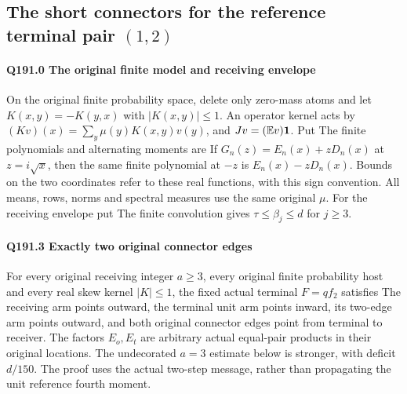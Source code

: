 \subsection{The short connectors for the reference terminal pair $(1,\allowbreak 2)$}\label{proof:Q5-C191}
\paragraph{Q191.0 The original finite model and receiving envelope}\label{part:Q191.0}
On the original finite probability space, delete only zero-mass atoms and let
$K(x,\allowbreak y)=\allowbreak -K(y,\allowbreak x)$ with $|K(x,\allowbreak y)|\le\allowbreak 1$. An operator kernel acts by
$(Kv)(x)=\allowbreak \sum_y\mu(y)K(x,\allowbreak y)v(y)$, and $Jv=\allowbreak (\mathbb E v)\mathbf1$. Put
The finite polynomials and alternating moments are
If $G_n(z)=\allowbreak E_n(x)+zD_n(x)$ at $z=\allowbreak i\sqrt x$, then the same finite
polynomial at $-z$ is $E_n(x)-zD_n(x)$. Bounds on the two coordinates
refer to these real functions, with this sign convention. All means,
rows, norms and spectral measures use the same original $\mu$.
For the receiving envelope put
The finite convolution gives $\tau\le\allowbreak \beta_j\le\allowbreak  d$ for $j\ge\allowbreak 3$.

\paragraph{Q191.3 Exactly two original connector edges}\label{part:Q191.3}
For every original receiving integer $a\ge\allowbreak 3$, every original finite
probability host and every real skew kernel $|K|\le\allowbreak 1$, the fixed actual
terminal $F=\allowbreak qf_2$ satisfies
The receiving arm points outward, the terminal unit arm points inward,
its two-edge arm points outward, and both original connector edges point
from terminal to receiver. The factors $E_o,\allowbreak E_t$ are arbitrary actual
equal-pair products in their original locations. The undecorated $a=\allowbreak 3$
estimate below is stronger, with deficit $d/150$.
The proof uses the actual two-step message, rather than propagating the
unit reference fourth moment.

